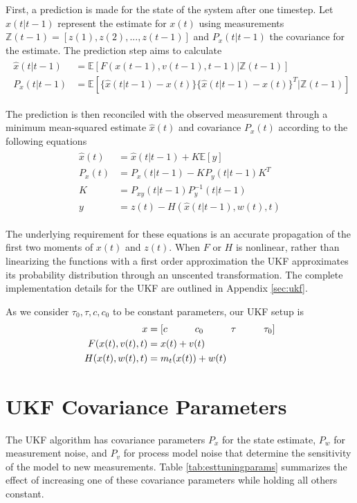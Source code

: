 First, a prediction is made for the state of the system after one timestep. Let $\hat{x}(t\vert t-1)$ represent the estimate for $x(t)$ using measurements $\mathbb{Z}(t-1)=[z(1), z(2), ..., z(t-1)]$ and $P_{x}(t\vert t-1)$ the covariance for the estimate. The prediction step aims to calculate
\begin{align}\begin{split}
  \hat{x}(t\vert t-1) &= \mathbb{E}[F(x(t-1), v(t-1), t-1)\vert \mathbb{Z}(t-1)]\\
  P_{x}(t\vert t-1) &= \mathbb{E}[\{ \hat{x}(t\vert t-1) - x(t) \} \{ \hat{x}(t\vert t-1) - x(t) \}^T \vert \mathbb{Z}(t-1)]
\end{split}\end{align}

The prediction is then reconciled with the observed measurement through a minimum mean-squared estimate $\hat{x}(t)$ and covariance $P_{x}(t)$ according to the following equations
\begin{align}
\begin{split}
  \hat{x}(t) &= \hat{x}(t\vert t-1) + K \mathbb{E}[y] \\
  P_{x}(t) &= P_{x}(t\vert t-1) - KP_{y}(t\vert t-1) K^T\\
  K &= P_{xy}(t\vert t-1) P_{y}^{-1}(t\vert t-1)\\
  y &= z(t) - H(\hat{x}(t\vert t-1) , w(t), t)
\end{split}
\end{align}

The underlying requirement for these equations is an accurate propagation of the first two moments of $x(t)$ and $z(t)$. When $F$ or $H$ is nonlinear, rather than linearizing the functions with a first order approximation the UKF approximates its probability distribution through an unscented transformation. The complete implementation details for the UKF are outlined in Appendix \ref{sec:ukf}.

As we consider $\tau_0, \tau, c, c_0$ to be constant parameters, our UKF setup is
\begin{align}
\begin{split}
  x &= [c \hspace*{1cm} c_0 \hspace*{1cm} \tau \hspace*{1cm} \tau_0]\\
  F(x(t), v(t), t) &= x(t) + v(t)\\
  H(x(t), w(t), t) &= m_t(x(t)) + w(t)
\end{split}
\end{align}

\section{UKF Covariance Parameters}\label{sec:ukfcovar}
The UKF algorithm has covariance parameters $P_{x}$ for the state estimate, $P_{w}$ for measurement noise, and $P_{v}$ for process model noise that determine the sensitivity of the model to new measurements. Table \ref{tab:esttuningparams} summarizes the effect of increasing one of these covariance parameters while holding all others constant.

